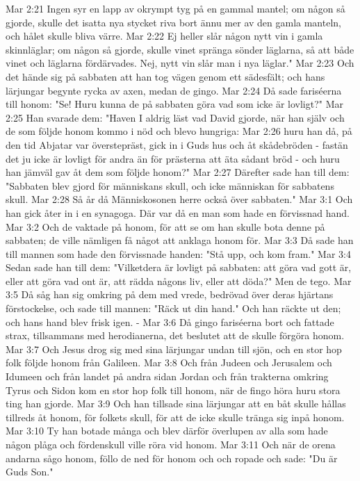 Mar 2:21  Ingen syr en lapp av okrympt tyg på en gammal mantel; om någon så gjorde, skulle det isatta nya stycket riva bort ännu mer av den gamla manteln, och hålet skulle bliva värre.
Mar 2:22  Ej heller slår någon nytt vin i gamla skinnläglar; om någon så gjorde, skulle vinet spränga sönder läglarna, så att både vinet och läglarna fördärvades. Nej, nytt vin slår man i nya läglar."
Mar 2:23  Och det hände sig på sabbaten att han tog vägen genom ett sädesfält; och hans lärjungar begynte rycka av axen, medan de gingo.
Mar 2:24  Då sade fariséerna till honom: "Se! Huru kunna de på sabbaten göra vad som icke är lovligt?"
Mar 2:25  Han svarade dem: "Haven I aldrig läst vad David gjorde, när han själv och de som följde honom kommo i nöd och blevo hungriga:
Mar 2:26  huru han då, på den tid Abjatar var överstepräst, gick in i Guds hus och åt skådebröden - fastän det ju icke är lovligt för andra än för prästerna att äta sådant bröd - och huru han jämväl gav åt dem som följde honom?"
Mar 2:27  Därefter sade han till dem: "Sabbaten blev gjord för människans skull, och icke människan för sabbatens skull.
Mar 2:28  Så år då Människosonen herre också över sabbaten."
Mar 3:1  Och han gick åter in i en synagoga. Där var då en man som hade en förvissnad hand.
Mar 3:2  Och de vaktade på honom, för att se om han skulle bota denne på sabbaten; de ville nämligen få något att anklaga honom för.
Mar 3:3  Då sade han till mannen som hade den förvissnade handen: "Stå upp, och kom fram."
Mar 3:4  Sedan sade han till dem: "Vilketdera är lovligt på sabbaten: att göra vad gott är, eller att göra vad ont är, att rädda någons liv, eller att döda?" Men de tego.
Mar 3:5  Då såg han sig omkring på dem med vrede, bedrövad över deras hjärtans förstockelse, och sade till mannen: "Räck ut din hand." Och han räckte ut den; och hans hand blev frisk igen. -
Mar 3:6  Då gingo fariséerna bort och fattade strax, tillsammans med herodianerna, det beslutet att de skulle förgöra honom.
Mar 3:7  Och Jesus drog sig med sina lärjungar undan till sjön, och en stor hop folk följde honom från Galileen.
Mar 3:8  Och från Judeen och Jerusalem och Idumeen och från landet på andra sidan Jordan och från trakterna omkring Tyrus och Sidon kom en stor hop folk till honom, när de fingo höra huru stora ting han gjorde.
Mar 3:9  Och han tillsade sina lärjungar att en båt skulle hållas tillreds åt honom, för folkets skull, för att de icke skulle tränga sig inpå honom.
Mar 3:10  Ty han botade många och blev därför överlupen av alla som hade någon plåga och fördenskull ville röra vid honom.
Mar 3:11  Och när de orena andarna sågo honom, föllo de ned för honom och och ropade och sade: "Du är Guds Son."
